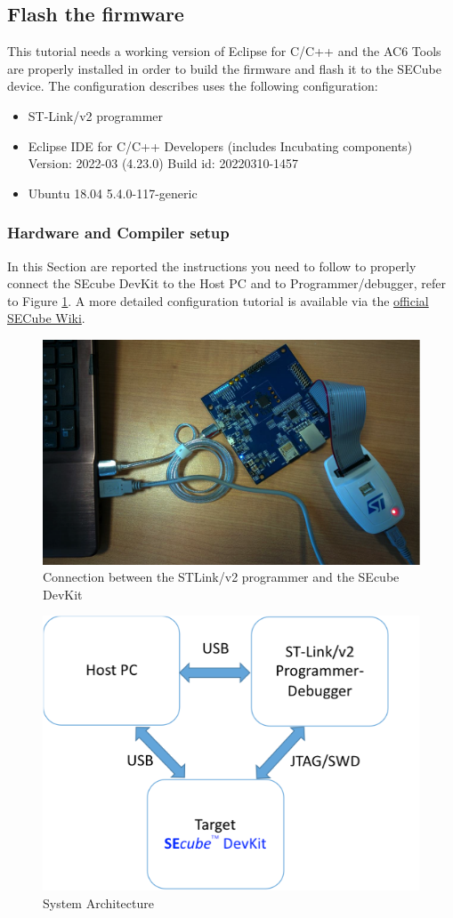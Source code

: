 \subsection{Flash the firmware}
This tutorial needs a working version of Eclipse for C/C++ and the AC6 Tools are properly installed in order to build the firmware and flash it to the SECube device. The configuration describes uses the following configuration:
\begin{itemize}
	\item ST-Link/v2 programmer
	\item Eclipse IDE for C/C++ Developers (includes Incubating components) Version: 2022-03 (4.23.0) Build id: 20220310-1457
	\item Ubuntu 18.04 5.4.0-117-generic
\end{itemize}

\subsubsection{Hardware and Compiler setup}
In this Section are reported the instructions you need to follow to properly connect the SEcube DevKit to the Host PC and to Programmer/debugger, refer to Figure \ref{fig:setup2}. A more detailed configuration tutorial is available via the  \href{https://github.com/SEcube-Project/SEcube-SDK/blob/master/wiki/wiki_rel_012.pdf}{official SECube Wiki}.

\begin{figure}[H]
	\centering
	\includegraphics[width=0.42\linewidth]{images/firmware/setup_2}
	\caption{Connection between the STLink/v2 programmer and the SEcube DevKit}
	\label{fig:setup2}
\end{figure}

\begin{figure}
	\centering
	\includegraphics[width=0.35\linewidth]{images/firmware/setup_4}
	\caption{System Architecture}
	\label{fig:setup4}
\end{figure}


